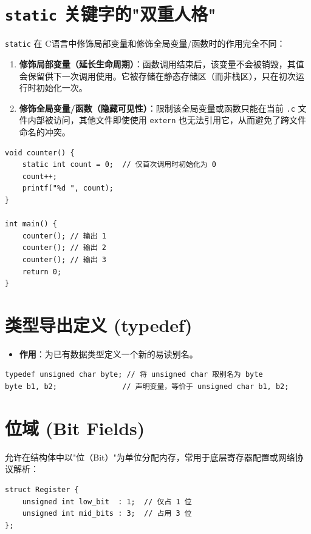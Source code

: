 \section{\texorpdfstring{\texttt{static} 关键字的"双重人格"}{static 关键字的双重人格}}

\texttt{static} 在 C语言中修饰局部变量和修饰全局变量/函数时的作用完全不同：

\begin{enumerate}
    \item \textbf{修饰局部变量（延长生命周期）}：函数调用结束后，该变量不会被销毁，其值会保留供下一次调用使用。它被存储在静态存储区（而非栈区），只在初次运行时初始化一次。
    \item \textbf{修饰全局变量/函数（隐藏可见性）}：限制该全局变量或函数只能在当前 \texttt{.c} 文件内部被访问，其他文件即使使用 \texttt{extern} 也无法引用它，从而避免了跨文件命名的冲突。
\end{enumerate}

\begin{lstlisting}[caption={static 修饰局部变量}]
void counter() {
    static int count = 0;  // 仅首次调用时初始化为 0
    count++;
    printf("%d ", count);
}

int main() {
    counter(); // 输出 1
    counter(); // 输出 2
    counter(); // 输出 3
    return 0;
}
\end{lstlisting}

\section{类型导出定义 (typedef)}

\begin{itemize}
    \item \textbf{作用}：为已有数据类型定义一个新的易读别名。
\end{itemize}

\begin{lstlisting}[caption={typedef 使用示例}]
typedef unsigned char byte; // 将 unsigned char 取别名为 byte
byte b1, b2;               // 声明变量，等价于 unsigned char b1, b2;
\end{lstlisting}

\section{位域 (Bit Fields)}

允许在结构体中以"位（Bit）"为单位分配内存，常用于底层寄存器配置或网络协议解析：

\begin{lstlisting}[caption={位域示例}]
struct Register {
    unsigned int low_bit  : 1;  // 仅占 1 位
    unsigned int mid_bits : 3;  // 占用 3 位
};
\end{lstlisting}

